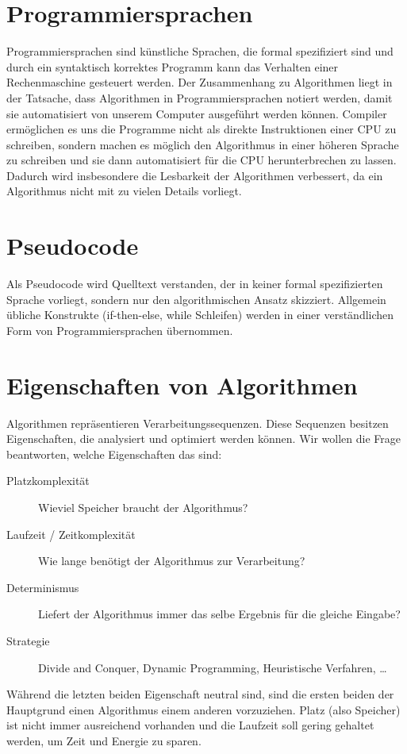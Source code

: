 \section{Programmiersprachen}
%
Programmiersprachen sind künstliche Sprachen, die formal spezifiziert sind und durch ein syntaktisch korrektes Programm kann das Verhalten einer Rechenmaschine gesteuert werden. Der Zusammenhang zu Algorithmen liegt in der Tatsache, dass Algorithmen in Programmiersprachen notiert werden, damit sie automatisiert von unserem Computer ausgeführt werden können. Compiler ermöglichen es uns die Programme nicht als direkte Instruktionen einer CPU zu schreiben, sondern machen es möglich den Algorithmus in einer höheren Sprache zu schreiben und sie dann automatisiert für die CPU herunterbrechen zu lassen. Dadurch wird insbesondere die Lesbarkeit der Algorithmen verbessert, da ein Algorithmus nicht mit zu vielen Details vorliegt.

\section{Pseudocode}
%
Als Pseudocode wird Quelltext verstanden, der in keiner formal spezifizierten Sprache vorliegt, sondern nur den algorithmischen Ansatz skizziert. Allgemein übliche Konstrukte (if-then-else, while Schleifen) werden in einer verständlichen Form von Programmiersprachen übernommen.

\section{Eigenschaften von Algorithmen}
%
Algorithmen repräsentieren Verarbeitungssequenzen. Diese Sequenzen besitzen Eigenschaften, die analysiert und optimiert werden können. Wir wollen die Frage beantworten, welche Eigenschaften das sind:
%
\begin{description}
 \item[Platzkomplexität] Wieviel Speicher braucht der Algorithmus?
 \item[Laufzeit / Zeitkomplexität] Wie lange benötigt der Algorithmus zur Verarbeitung?
 \item[Determinismus] Liefert der Algorithmus immer das selbe Ergebnis für die gleiche Eingabe?
 \item[Strategie] Divide and Conquer, Dynamic Programming, Heuristische Verfahren, \dots
\end{description}

Während die letzten beiden Eigenschaft neutral sind, sind die ersten beiden der Hauptgrund einen Algorithmus einem anderen vorzuziehen. Platz (also Speicher) ist nicht immer ausreichend vorhanden und die Laufzeit soll gering gehaltet werden, um Zeit und Energie zu sparen.

